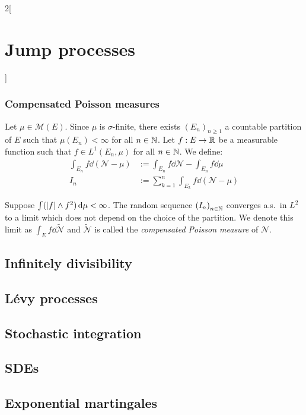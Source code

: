\documentclass[../../../main_math.tex]{subfiles}
\begin{document}
\begin{multicols}{2}[\section{Jump processes}]
  \subsubsection{Compensated Poisson measures}
  \begin{definition}
    Let $\mu \in\mathcal{M}(E)$. Since $\mu$ is $\sigma$-finite, there exists ${(E_n)}_{n\geq 1}$ a countable partition of $E$ such that $\mu(E_n)<\infty$ for all $n\in\mathbb{N}$. Let $f:E\to\mathbb{R}$ be a measurable function such that $f\in L^1(E_n,\mu)$ for all $n\in\mathbb{N}$. We define:
    \begin{align*}
      \int_{E_n}f\dd{(\mathcal{N}-\mu)} & := \int_{E_n}f\dd{\mathcal{N}}-\int_{E_n}f\dd{\mu} \\
      I_n                               & :=\sum_{k=1}^{n}\int_{E_k} f\dd{(\mathcal{N}-\mu)}
    \end{align*}
  \end{definition}
  \begin{proposition}
    Suppose $\int (\abs{f}\wedge f^2)\dd{\mu}<\infty$. The random sequence ${(I_n)}_{n\in\mathbb{N}}$ converges a.s.\ in $L^2$ to a limit which does not depend on the choice of the partition. We denote this limit as $\int_E f\dd{\tilde{\mathcal{N}}}$ and $\tilde{\mathcal{N}}$ is called the \emph{compensated Poisson measure} of $\mathcal{N}$.
  \end{proposition}
  \subsection{Infinitely divisibility}
  \subsection{Lévy processes}
  \subsection{Stochastic integration}
  \subsection{SDEs}
  \subsection{Exponential martingales}
\end{multicols}
\end{document}
